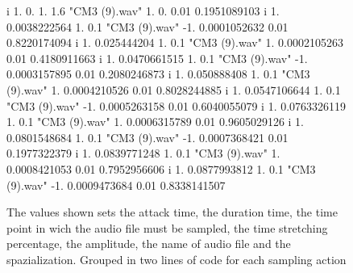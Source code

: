 			\begin{figure}[h]
				\begin{center}
					\begin{code}
						i          1.                    0.                    1.                    1.6         	"CM3 (9).wav"          1.                    0.                    0.01                  0.1951089103
						i          1.                    0.0038222564          1.                    0.1         	"CM3 (9).wav"         -1.                    0.0001052632          0.01                  0.8220174094
						i          1.                    0.025444204           1.                    0.1         	"CM3 (9).wav"          1.                    0.0002105263          0.01                  0.4180911663
						i          1.                    0.0470661515          1.                    0.1         	"CM3 (9).wav"         -1.                    0.0003157895          0.01                  0.2080246873
						i          1.                    0.050888408           1.                    0.1         	"CM3 (9).wav"          1.                    0.0004210526          0.01                  0.8028244885
						i          1.                    0.0547106644          1.                    0.1         	"CM3 (9).wav"         -1.                    0.0005263158          0.01                  0.6040055079
						i          1.                    0.0763326119          1.                    0.1         	"CM3 (9).wav"          1.                    0.0006315789          0.01                  0.9605029126
						i          1.                    0.0801548684          1.                    0.1         	"CM3 (9).wav"         -1.                    0.0007368421          0.01                  0.1977322379
						i          1.                    0.0839771248          1.                    0.1         	"CM3 (9).wav"          1.                    0.0008421053          0.01                  0.7952956606
						i          1.                    0.0877993812          1.                    0.1         	"CM3 (9).wav"         -1.                    0.0009473684          0.01                  0.8338141507
					\end{code}
					\caption{The values shown sets the attack time, the duration time, the time point in wich the audio file must be sampled, the time stretching percentage, the amplitude, the name of audio file and the spazialization. Grouped in two lines of code for each sampling action}
				\end{center}
			\end{figure}
		
